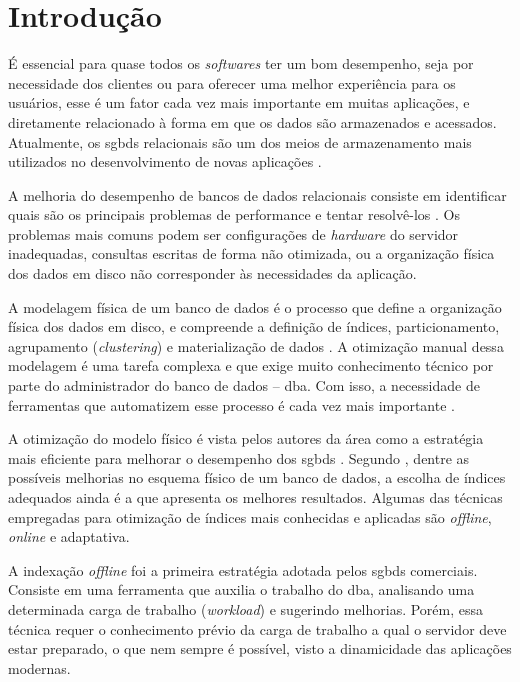 \chapter{Introdução}
\label{introducao}

É essencial para quase todos os \emph{softwares} ter um bom desempenho, seja por necessidade dos clientes ou para oferecer uma melhor experiência para os usuários, esse é um fator cada vez mais importante em muitas aplicações, e diretamente relacionado à forma em que os dados são armazenados e acessados. Atualmente, os \glspl{sgbd} relacionais são um dos meios de armazenamento mais utilizados no desenvolvimento de novas aplicações \cite{Heuser:2009}.

A melhoria do desempenho de bancos de dados relacionais consiste em identificar quais são os principais problemas de performance e tentar resolvê-los \cite{Thalheim:2011}. Os problemas mais comuns podem ser configurações de \emph{hardware} do servidor inadequadas, consultas escritas de forma não otimizada, ou a organização física dos dados em disco não corresponder às necessidades da aplicação.

A modelagem física de um banco de dados é o processo que define a organização física dos dados em disco, e compreende a definição de índices, particionamento, agrupamento (\emph{clustering}) e materialização de dados \cite[p. 7]{Lightstone:2007}. A otimização manual dessa modelagem é uma tarefa complexa e que exige muito conhecimento técnico por parte do administrador do banco de dados -- \gls{dba}. Com isso, a necessidade de ferramentas que automatizem esse processo é cada vez mais importante \cite{Alagiannis:2010}.

A otimização do modelo físico é vista pelos autores da área como a estratégia mais eficiente para melhorar o desempenho dos \glspl{sgbd} \cite{Thalheim:2011,Zilio:2004}. Segundo \citet{Petraki:2015}, dentre as possíveis melhorias no esquema físico de um banco de dados, a escolha de índices adequados ainda é a que apresenta os melhores resultados. Algumas das técnicas empregadas para otimização de índices mais conhecidas e aplicadas são \emph{offline}, \emph{online} e adaptativa.

A indexação \emph{offline} foi a primeira estratégia adotada pelos \glspl{sgbd} comerciais. Consiste em uma ferramenta que auxilia o trabalho do \gls{dba}, analisando uma determinada carga de trabalho (\emph{workload}) e sugerindo melhorias. Porém, essa técnica requer o conhecimento prévio da carga de trabalho a qual o servidor deve estar preparado, o que nem sempre é possível, visto a dinamicidade das aplicações modernas.


